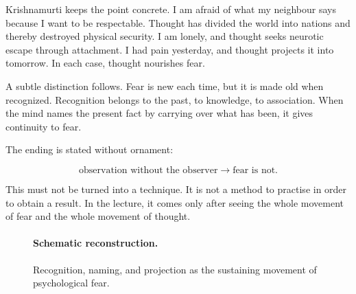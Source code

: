 Krishnamurti keeps the point concrete. I am afraid of what my neighbour says because I want to be respectable. Thought has divided the world into nations and thereby destroyed physical security. I am lonely, and thought seeks neurotic escape through attachment. I had pain yesterday, and thought projects it into tomorrow. In each case, thought nourishes fear.

A subtle distinction follows. Fear is new each time, but it is made old when recognized. Recognition belongs to the past, to knowledge, to association. When the mind names the present fact by carrying over what has been, it gives continuity to fear.

The ending is stated without ornament:

\begin{equation}
\text{observation without the observer}
\longrightarrow
\text{fear is not}.
\end{equation}

This must not be turned into a technique. It is not a method to practise in order to obtain a result. In the lecture, it comes only after seeing the whole movement of fear and the whole movement of thought.

\begin{figure}
\centering
{}

\paragraph{Schematic reconstruction.}
Recognition, naming, and projection as the sustaining movement of psychological fear.
\end{figure}

